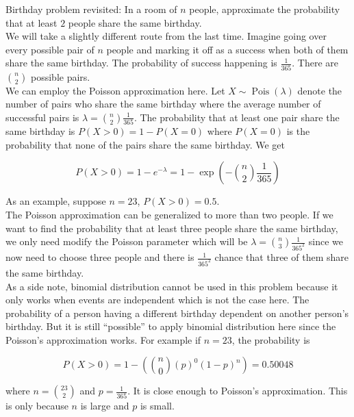 \documentclass[12pt, a4paper]{article}
\newcounter{exa}
\newcommand{\Pois}{\operatorname{Pois}}
\begin{document}
\begin{texample}
Birthday problem revisited: In a room of $n$ people, approximate the probability that at least $2$ people share the same birthday. \\

We will take a slightly different route from the last time. Imagine going over every possible pair of $n$ people and marking it off as a success when both of them share the same birthday. The probability of success happening is $\frac{1}{365}$. There are ${n \choose 2}$ possible pairs. \\

We can employ the Poisson approximation here. Let $X\sim\Pois(\lambda)$ denote the number of pairs who share the same birthday where the average number of successful pairs is $\lambda={n \choose 2}\frac{1}{365}$. The probability that at least one pair share the same birthday is $P(X>0)=1-P(X=0)$ where $P(X=0)$ is the probability that none of the pairs share the same birthday. We get

$$P(X>0)=1-e^{-\lambda}=1-\exp\left( -{n \choose 2}\frac{1}{365} \right)$$

As an example, suppose $n=23$, $P(X>0)=0.5$. \\

The Poisson approximation can be generalized to more than two people. If we want to find the probability that at least three people share the same birthday, we only need modify the Poisson parameter which will be $\lambda={n \choose 3}\frac{1}{365^2}$ since we now need to choose three people and there is $\frac{1}{365^2}$ chance that three of them share the same birthday. \\

As a side note, binomial distribution cannot be used in this problem because it only works when events are independent which is not the case here. The probability of a person having a different birthday dependent on another person's birthday. But it is still ``possible'' to apply binomial distribution here since the Poisson's approximation works. For example if $n=23$, the probability is

$$P(X>0)=1-\left({n \choose 0} \left( p \right)^0 \left( 1-p \right)^{n}\right)=0.50048$$

where $n={23 \choose 2}$ and $p=\frac{1}{365}$. It is close enough to Poisson's approximation. This is only because $n$ is large and $p$ is small.
\end{texample}
\end{document}
